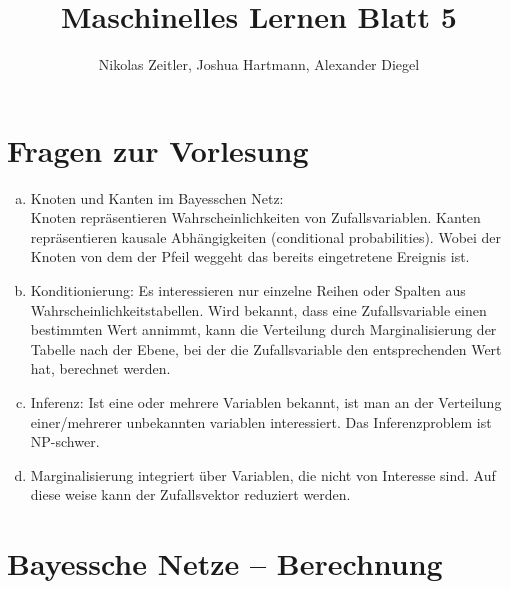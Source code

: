 \documentclass[a4paper]{scrartcl}
\author{Nikolas Zeitler, Joshua Hartmann, Alexander Diegel}
\title{Maschinelles Lernen Blatt 5}
\begin{document}
\maketitle
\section{Fragen zur Vorlesung}
%
\begin{enumerate}[a)]
	\item Knoten und Kanten im Bayesschen Netz:\\
	Knoten repräsentieren Wahrscheinlichkeiten von Zufallsvariablen.
	Kanten repräsentieren kausale Abhängigkeiten (conditional probabilities). Wobei der Knoten von dem der Pfeil weggeht das bereits eingetretene Ereignis ist. 
	\item Konditionierung: Es interessieren nur einzelne Reihen oder Spalten aus Wahrscheinlichkeitstabellen. Wird bekannt, dass eine Zufallsvariable einen bestimmten Wert annimmt, kann die Verteilung durch Marginalisierung der Tabelle nach der Ebene, bei der die Zufallsvariable den entsprechenden Wert hat, berechnet werden.
	
	\item Inferenz: Ist eine oder mehrere Variablen bekannt, ist man an der Verteilung einer/mehrerer unbekannten variablen interessiert. Das Inferenzproblem ist NP-schwer.
	
	\item Marginalisierung integriert über Variablen, die nicht von Interesse sind. Auf diese weise kann der Zufallsvektor reduziert werden.
\end{enumerate}


\section{Bayessche Netze – Berechnung}
\end{document}
